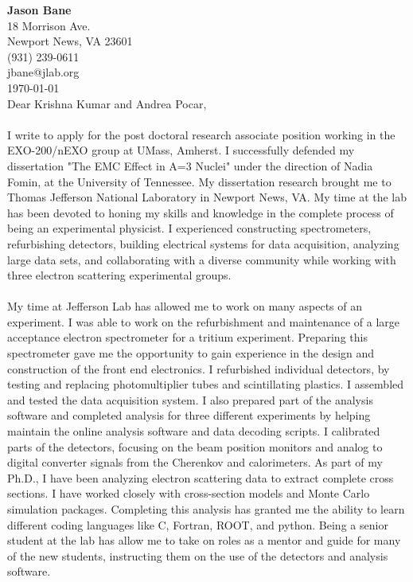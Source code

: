\documentclass[12pt,letterpaper]{article}
\newcommand{\CPP}
{C\nolinebreak[4]\hspace{-.05em}\raisebox{.22ex}{\footnotesize\bf ++}}
\begin{document}
\vspace*{-1.2cm}
\noindent\textbf{Jason Bane}\\
18 Morrison Ave. \\
Newport News, VA 23601 \\
(931) 239-0611 \\
jbane@jlab.org \\
\today\\

Dear Krishna Kumar and Andrea Pocar, 

\paragraph{}I write to apply for the post doctoral research associate position working in the EXO-200/nEXO group at UMass, Amherst. I successfully defended my dissertation "The EMC Effect in A=3 Nuclei" under the direction of Nadia Fomin, at the University of Tennessee. My dissertation research brought me to Thomas Jefferson National Laboratory in Newport News, VA. My time at the lab has been devoted to honing my skills and knowledge in the complete process of being an experimental physicist. I experienced constructing spectrometers, refurbishing detectors, building electrical systems for data acquisition, analyzing large data sets, and collaborating with a diverse community while working with three electron scattering experimental groups.
\paragraph{}My time at Jefferson Lab has allowed me to work on many aspects of an experiment. I was able to work on the refurbishment and maintenance of a large acceptance electron spectrometer for a tritium experiment. Preparing this spectrometer gave me the opportunity to gain experience in the design and construction of the front end electronics. I refurbished individual detectors, by testing and replacing photomultiplier tubes and scintillating plastics. I assembled and tested the data acquisition system.
I also prepared part of the analysis software and completed analysis for three different experiments by helping maintain the online analysis software and data decoding scripts. I calibrated parts of the detectors, focusing on the beam position monitors and analog to digital converter signals from the Cherenkov and calorimeters. As part of my Ph.D., I have been analyzing electron scattering data to extract complete cross sections. I have worked closely with cross-section models and Monte Carlo simulation packages. Completing this analysis has granted me the ability to learn different coding languages like \CPP, Fortran, ROOT, and python. Being a senior student at the lab has allow me to take on roles as a mentor and guide for many of the new students, instructing them on the use of the detectors and analysis software.
\end{document}
